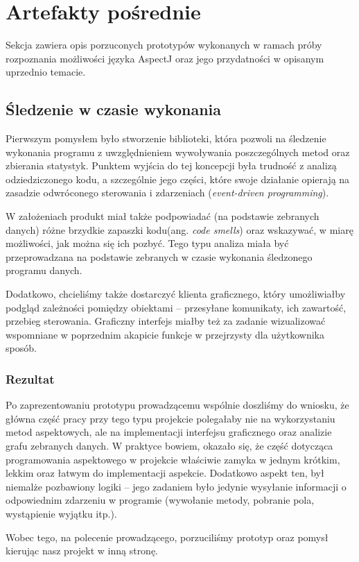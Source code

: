 \documentclass[12pt,a4paper,titlepage]{article}
\begin{document}
\section{Artefakty pośrednie}
 Sekcja zawiera opis porzuconych prototypów wykonanych w ramach próby rozpoznania możliwości języka AspectJ oraz jego przydatności w opisanym uprzednio temacie.
 \subsection{Śledzenie w czasie wykonania}
  Pierwszym pomysłem było stworzenie biblioteki, która pozwoli na śledzenie wykonania programu z uwzględnieniem wywoływania poszczególnych metod oraz zbierania statystyk. Punktem wyjścia do tej koncepcji była trudność z analizą odziedziczonego kodu, a szczególnie jego części, które swoje działanie opierają na zasadzie odwróconego sterowania i zdarzeniach (\emph{event-driven programming}).
  
  W założeniach produkt miał także podpowiadać (na podstawie zebranych danych) różne brzydkie zapaszki kodu(ang. \textit{code smells}) oraz wskazywać, w miarę możliwości, jak można się ich pozbyć. Tego typu analiza miała być przeprowadzana na podstawie zebranych w czasie wykonania śledzonego programu danych.
  
  Dodatkowo, chcieliśmy także dostarczyć klienta graficznego, który umożliwiałby podgląd zależności pomiędzy obiektami -- przesyłane komunikaty, ich zawartość, przebieg sterowania. Graficzny interfejs miałby też za zadanie wizualizować wspomniane w poprzednim akapicie funkcje w przejrzysty dla użytkownika sposób.
  \subsubsection*{Rezultat}
   Po zaprezentowaniu prototypu prowadzącemu wspólnie doszliśmy do wniosku, że główna część pracy przy tego typu projekcie polegałaby nie na wykorzystaniu metod aspektowych, ale na implementacji interfejsu graficznego oraz analizie grafu zebranych danych. W praktyce bowiem, okazało się, że część dotycząca programowania aspektowego w projekcie właściwie zamyka w jednym krótkim, lekkim oraz łatwym do implementacji aspekcie. Dodatkowo aspekt ten, był niemalże pozbawiony logiki -- jego zadaniem było jedynie wysyłanie informacji o odpowiednim zdarzeniu w programie (wywołanie metody, pobranie pola, wystąpienie wyjątku itp.). 
   
   Wobec tego, na polecenie prowadzącego, porzuciliśmy prototyp oraz pomysł kierując nasz projekt w inną stronę. 
   
\end{document}
